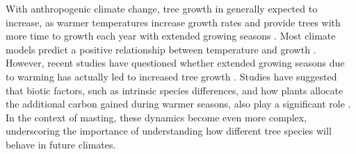 \documentclass[11pt,letter]{article}
\begin{document}
With anthropogenic climate change, tree growth in generally expected to increase, as warmer temperatures increase growth rates and provide trees with more time to growth each year with extended growing seasons \citep{keenan2014net, finzi2020carbon}. Most climate models predict a positive relationship between temperature and growth \citep{friedlingstein2022global, ito2020global}. However, recent studies have questioned whether extended growing seasons due to warming has actually led to increased tree growth \citep{dow2022warm, green2022limits}. Studies have suggested that biotic factors, such as intrinsic species differences, and how plants allocate the additional carbon gained during warmer seasons, also play a significant role \citep{hacket2016consistent}. In the context of masting, these dynamics become even more complex, underscoring the importance of understanding how different tree species will behave in future climates.\par
\end{document}
